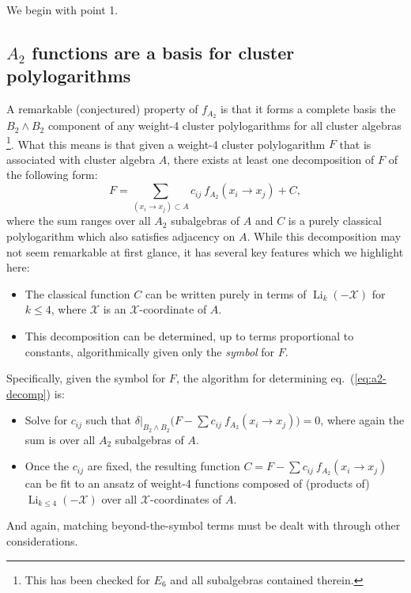 \documentclass[11pt]{article}
\DeclareMathOperator{\Li}{Li}
\def\x{\mathcal{X}}
\def\xcoord{$\mathcal{X}$-coordinate }
\def\xcoords{$\mathcal{X}$-coordinates }
\def\pdfeq#1{\texorpdfstring{$#1$}{a}}
\begin{document}
We begin with point 1. 

\subsection{\pdfeq{A_2} functions are a basis for cluster polylogarithms}

A remarkable (conjectured) property of $f_{A_2}$ is that it forms a complete basis the $B_2 \wedge B_2$ component of any weight-4 cluster polylogarithms for all cluster algebras \footnote{This has been checked for $E_6$ and all subalgebras contained therein.}. What this means is that given a weight-4 cluster polylogarithm $F$ that is associated with cluster algebra $A$, there exists at least one decomposition of $F$ of the following form:
\begin{equation}\label{eq:a2-decomp}
	F = \sum_{(x_i\to x_j) \subset A} c_{ij} ~f_{A_2}(x_i \to x_j) + C, 
\end{equation}
where the sum ranges over all $A_2$ subalgebras of $A$ and $C$ is a purely classical polylogarithm which also satisfies adjacency on $A$. While this decomposition may not seem remarkable at first glance, it has several key features which we highlight here:
\begin{itemize}
	\item The classical function $C$ can be written purely in terms of $\Li_{k}(-\x)$ for $k\le4$, where $\x$ is an \xcoord of $A$.
	\item This decomposition can be determined, up to terms proportional to constants, algorithmically given only the \emph{symbol} for $F$.
\end{itemize}
Specifically, given the symbol for $F$, the algorithm for determining eq.~(\ref{eq:a2-decomp}) is: 
\begin{itemize}
	\item Solve for $c_{ij}$ such that $\delta|_{B_2 \wedge B_2}\big(F - \sum c_{ij} ~f_{A_2}(x_i \to x_j)\big) = 0$, where again the sum is over all $A_2$ subalgebras of $A$.
	\item Once the $c_{ij}$ are fixed, the resulting function $C = F - \sum c_{ij} ~f_{A_2}(x_i \to x_j)$ can be fit to an ansatz of weight-4 functions composed of (products of) $\Li_{k\le4}(-\x)$ over all \xcoords of $A$. 
\end{itemize}
And again, matching beyond-the-symbol terms must be dealt with through other considerations. 
\end{document}
